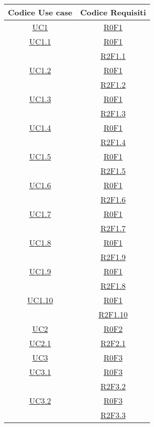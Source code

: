 \normalsize
\begin{longtable}{|c|c|}
\hline
\textbf{Codice Use case} & \textbf{Codice Requisiti} \\
\hline
\endhead
\hyperlink{UC1}{UC1} & \hyperlink{R0F1}{R0F1}\\
\hline
\hyperlink{UC1.1}{UC1.1} & \hyperlink{R0F1}{R0F1}\\
& \hyperlink{R2F1.1}{R2F1.1}\\
\hline
\hyperlink{UC1.2}{UC1.2} & \hyperlink{R0F1}{R0F1}\\
& \hyperlink{R2F1.2}{R2F1.2}\\
\hline
\hyperlink{UC1.3}{UC1.3} & \hyperlink{R0F1}{R0F1}\\
& \hyperlink{R2F1.3}{R2F1.3}\\
\hline
\hyperlink{UC1.4}{UC1.4} & \hyperlink{R0F1}{R0F1}\\
& \hyperlink{R2F1.4}{R2F1.4}\\
\hline
\hyperlink{UC1.5}{UC1.5} & \hyperlink{R0F1}{R0F1}\\
& \hyperlink{R2F1.5}{R2F1.5}\\
\hline
\hyperlink{UC1.6}{UC1.6} & \hyperlink{R0F1}{R0F1}\\
& \hyperlink{R2F1.6}{R2F1.6}\\
\hline
\hyperlink{UC1.7}{UC1.7} & \hyperlink{R0F1}{R0F1}\\
& \hyperlink{R2F1.7}{R2F1.7}\\
\hline
\hyperlink{UC1.8}{UC1.8} & \hyperlink{R0F1}{R0F1}\\
& \hyperlink{R2F1.9}{R2F1.9}\\
\hline
\hyperlink{UC1.9}{UC1.9} & \hyperlink{R0F1}{R0F1}\\
& \hyperlink{R2F1.8}{R2F1.8}\\
\hline
\hyperlink{UC1.10}{UC1.10} & \hyperlink{R0F1}{R0F1}\\
& \hyperlink{R2F1.10}{R2F1.10}\\
\hline
\hyperlink{UC2}{UC2} & \hyperlink{R0F2}{R0F2}\\
\hline
\hyperlink{UC2.1}{UC2.1} & \hyperlink{R2F2.1}{R2F2.1}\\
\hline
\hyperlink{UC3}{UC3} & \hyperlink{R0F3}{R0F3}\\
\hline
\hyperlink{UC3.1}{UC3.1} & \hyperlink{R0F3}{R0F3}\\
& \hyperlink{R2F3.2}{R2F3.2}\\
\hline
\hyperlink{UC3.2}{UC3.2} & \hyperlink{R0F3}{R0F3}\\
& \hyperlink{R2F3.3}{R2F3.3}\\

\end{longtable}
